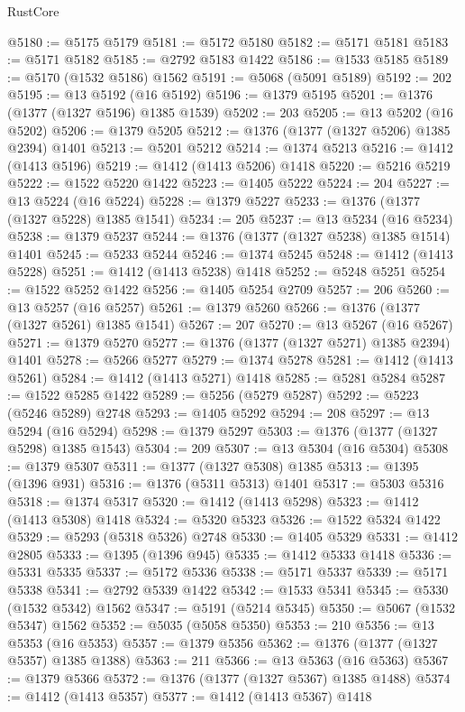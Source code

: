 \begin{lexlean}{RustCore}
\begin{coremodule}
@5180 := @5175 @5179
@5181 := @5172 @5180
@5182 := @5171 @5181
@5183 := @5171 @5182
@5185 := @2792 @5183 @1422
@5186 := @1533 @5185
@5189 := @5170 (@1532 @5186) @1562
@5191 := @5068 (@5091 @5189)
@5192 := 202
@5195 := @13 @5192 (@16 @5192)
@5196 := @1379 @5195
@5201 := @1376 (@1377 (@1327 @5196) @1385 @1539)
@5202 := 203
@5205 := @13 @5202 (@16 @5202)
@5206 := @1379 @5205
@5212 := @1376 (@1377 (@1327 @5206) @1385 @2394) @1401
@5213 := @5201 @5212
@5214 := @1374 @5213
@5216 := @1412 (@1413 @5196)
@5219 := @1412 (@1413 @5206) @1418
@5220 := @5216 @5219
@5222 := @1522 @5220 @1422
@5223 := @1405 @5222
@5224 := 204
@5227 := @13 @5224 (@16 @5224)
@5228 := @1379 @5227
@5233 := @1376 (@1377 (@1327 @5228) @1385 @1541)
@5234 := 205
@5237 := @13 @5234 (@16 @5234)
@5238 := @1379 @5237
@5244 := @1376 (@1377 (@1327 @5238) @1385 @1514) @1401
@5245 := @5233 @5244
@5246 := @1374 @5245
@5248 := @1412 (@1413 @5228)
@5251 := @1412 (@1413 @5238) @1418
@5252 := @5248 @5251
@5254 := @1522 @5252 @1422
@5256 := @1405 @5254 @2709
@5257 := 206
@5260 := @13 @5257 (@16 @5257)
@5261 := @1379 @5260
@5266 := @1376 (@1377 (@1327 @5261) @1385 @1541)
@5267 := 207
@5270 := @13 @5267 (@16 @5267)
@5271 := @1379 @5270
@5277 := @1376 (@1377 (@1327 @5271) @1385 @2394) @1401
@5278 := @5266 @5277
@5279 := @1374 @5278
@5281 := @1412 (@1413 @5261)
@5284 := @1412 (@1413 @5271) @1418
@5285 := @5281 @5284
@5287 := @1522 @5285 @1422
@5289 := @5256 (@5279 @5287)
@5292 := @5223 (@5246 @5289) @2748
@5293 := @1405 @5292
@5294 := 208
@5297 := @13 @5294 (@16 @5294)
@5298 := @1379 @5297
@5303 := @1376 (@1377 (@1327 @5298) @1385 @1543)
@5304 := 209
@5307 := @13 @5304 (@16 @5304)
@5308 := @1379 @5307
@5311 := @1377 (@1327 @5308) @1385
@5313 := @1395 (@1396 @931)
@5316 := @1376 (@5311 @5313) @1401
@5317 := @5303 @5316
@5318 := @1374 @5317
@5320 := @1412 (@1413 @5298)
@5323 := @1412 (@1413 @5308) @1418
@5324 := @5320 @5323
@5326 := @1522 @5324 @1422
@5329 := @5293 (@5318 @5326) @2748
@5330 := @1405 @5329
@5331 := @1412 @2805
@5333 := @1395 (@1396 @945)
@5335 := @1412 @5333 @1418
@5336 := @5331 @5335
@5337 := @5172 @5336
@5338 := @5171 @5337
@5339 := @5171 @5338
@5341 := @2792 @5339 @1422
@5342 := @1533 @5341
@5345 := @5330 (@1532 @5342) @1562
@5347 := @5191 (@5214 @5345)
@5350 := @5067 (@1532 @5347) @1562
@5352 := @5035 (@5058 @5350)
@5353 := 210
@5356 := @13 @5353 (@16 @5353)
@5357 := @1379 @5356
@5362 := @1376 (@1377 (@1327 @5357) @1385 @1388)
@5363 := 211
@5366 := @13 @5363 (@16 @5363)
@5367 := @1379 @5366
@5372 := @1376 (@1377 (@1327 @5367) @1385 @1488)
@5374 := @1412 (@1413 @5357)
@5377 := @1412 (@1413 @5367) @1418

\end{coremodule}
\end{lexlean}
